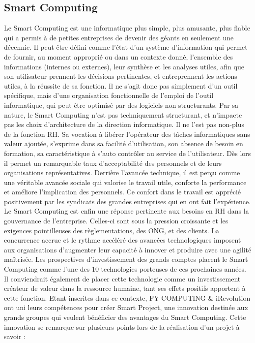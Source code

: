\documentclass[a4paper,11pt,oneside]{report}
\begin{document}
\subsection{Smart Computing}
Le Smart Computing est une informatique plus simple, plus amusante, plus fiable qui a permis à de petites entreprises de devenir des géants en seulement une décennie. Il peut être défini comme l'état d'un système d'information qui permet de fournir, au moment approprié ou dans un contexte donné, l'ensemble des informations (internes ou externes), leur synthèse et les analyses utiles, afin que son utilisateur prennent les décisions pertinentes, et entreprennent les actions utiles, à la réussite de sa fonction. Il ne s'agit donc pas simplement d'un outil spécifique, mais d'une organisation fonctionnelle de l'emploi de l'outil informatique, qui peut être optimisé par des logiciels non structurants.
\newline
\newline
Par sa nature, le Smart Computing n'est pas techniquement structurant, et n’impacte pas les choix d’architecture de la direction informatique. Il ne l'est pas non-plus de la fonction RH. Sa vocation à libérer l'opérateur des tâches informatiques sans valeur ajoutée, s'exprime dans sa facilité d'utilisation, son absence de besoin en formation, sa caractéristique à s'auto contrôler au service de l'utilisateur.
\newline
\newline
Dès lors il permet un remarquable taux d'acceptabilité des personnels et de leurs organisations représentatives. Derrière l'avancée technique, il est perçu comme une véritable avancée sociale qui valorise le travail utile, conforte la performance et améliore l'implication des personnels. Ce confort dans le travail est apprécié positivement par les syndicats des grandes entreprises qui en ont fait l'expérience.
\newline
\newline
Le Smart Computing est enfin une réponse pertinente aux besoins en RH dans la gouvernance de l'entreprise. Celles-ci sont sous la pression croissante et les exigences pointilleuses des règlementations, des ONG, et des clients. La concurrence accrue et le rythme accéléré des avancées technologiques imposent aux organisations d'augmenter leur capacité à innover et produire avec une agilité maîtrisée.
\newline
\newline
Les prospectives d'investissement des grands comptes placent le Smart Computing comme l'une des 10 technologies porteuses de ces prochaines années. Il conviendrait également de placer cette technologie comme un investissement créateur de valeur dans la ressource humaine, tant ses effets positifs apportent à cette fonction.
\newline
\newline
Etant inscrites dans ce contexte, FY COMPUTING \& iRevolution ont uni leurs compétences pour créer Smart Project, une innovation destinée aux grands groupes qui veulent bénéficier des avantages du Smart Computing. Cette innovation se remarque sur plusieurs points lors de la réalisation d’un projet à savoir :
\end{document}
